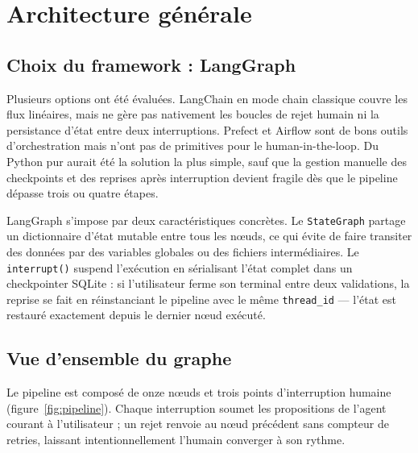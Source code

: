 \documentclass[12pt,a4paper]{article}
\begin{document}
\section{Architecture générale}

\subsection{Choix du framework : LangGraph}

Plusieurs options ont été évaluées. LangChain en mode chain classique couvre les flux
linéaires, mais ne gère pas nativement les boucles de rejet humain ni la persistance
d'état entre deux interruptions. Prefect et Airflow sont de bons outils d'orchestration
mais n'ont pas de primitives pour le human-in-the-loop. Du Python pur aurait été la
solution la plus simple, sauf que la gestion manuelle des checkpoints et des reprises
après interruption devient fragile dès que le pipeline dépasse trois ou quatre étapes.

LangGraph s'impose par deux caractéristiques concrètes. Le \texttt{StateGraph} partage
un dictionnaire d'état mutable entre tous les nœuds, ce qui évite de faire transiter
des données par des variables globales ou des fichiers intermédiaires. Le \texttt{interrupt()}
suspend l'exécution en sérialisant l'état complet dans un checkpointer SQLite : si
l'utilisateur ferme son terminal entre deux validations, la reprise se fait en
réinstanciant le pipeline avec le même \texttt{thread\_id} --- l'état est restauré
exactement depuis le dernier nœud exécuté.

\subsection{Vue d'ensemble du graphe}

Le pipeline est composé de onze nœuds et trois points d'interruption humaine
(figure~\ref{fig:pipeline}). Chaque interruption soumet les propositions de l'agent
courant à l'utilisateur ; un rejet renvoie au nœud précédent sans compteur de retries,
laissant intentionnellement l'humain converger à son rythme.
\end{document}
